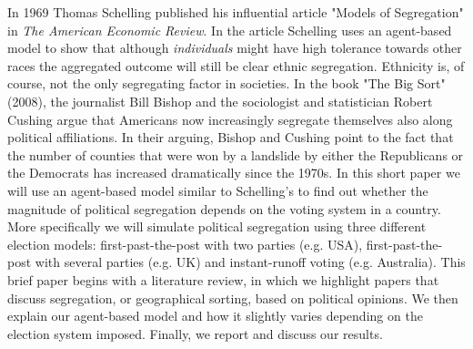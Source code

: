 \documentclass[12pt, a4paper]{article}
\begin{document}
	In 1969 Thomas Schelling published his influential article "Models of Segregation" in \textit{The American Economic Review}. In the article Schelling uses an agent-based model to show that although \textit{individuals} might have high tolerance towards other races the aggregated outcome will still be clear ethnic segregation. Ethnicity is, of course, not the only segregating factor in societies. In the book "The Big Sort" (2008), the journalist Bill Bishop and the sociologist and statistician Robert Cushing argue that Americans now increasingly segregate themselves also along political affiliations. In their arguing, Bishop and Cushing point to the fact that the number of counties that were won by a landslide by either the Republicans or the Democrats has increased dramatically since the 1970s. 
	\newline In this short paper we will use an agent-based model similar to Schelling's to find out whether the magnitude of political segregation depends on the voting system in a country. More specifically we will simulate political segregation using three different election models: first-past-the-post with two parties (e.g. USA), first-past-the-post with several parties (e.g. UK) and instant-runoff voting (e.g. Australia). This brief paper begins with a literature review, in which we highlight papers that discuss segregation, or geographical sorting, based on political opinions. We then explain our agent-based model and how it slightly varies depending on the election system imposed. Finally, we report and discuss our results.
	
	
\end{document}
